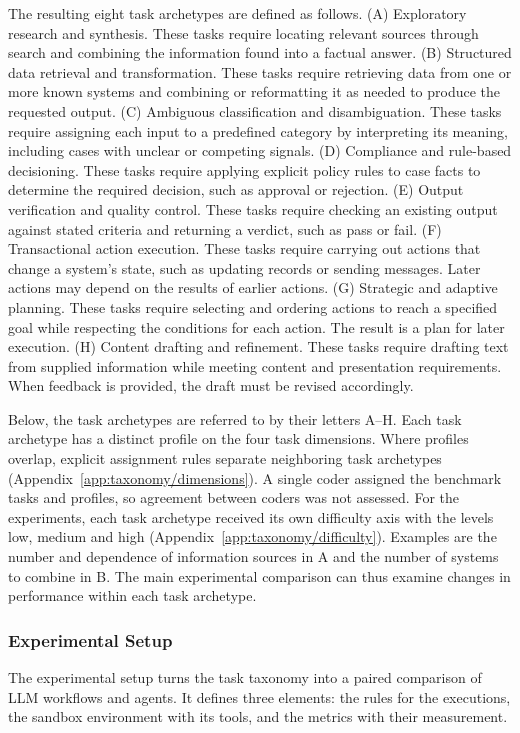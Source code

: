 The resulting eight task archetypes are defined as follows. (A) Exploratory research and synthesis. These tasks require locating relevant sources through search and combining the information found into a factual answer. (B) Structured data retrieval and transformation. These tasks require retrieving data from one or more known systems and combining or reformatting it as needed to produce the requested output. (C) Ambiguous classification and disambiguation. These tasks require assigning each input to a predefined category by interpreting its meaning, including cases with unclear or competing signals. (D) Compliance and rule-based decisioning. These tasks require applying explicit policy rules to case facts to determine the required decision, such as approval or rejection. (E) Output verification and quality control. These tasks require checking an existing output against stated criteria and returning a verdict, such as pass or fail. (F) Transactional action execution. These tasks require carrying out actions that change a system's state, such as updating records or sending messages. Later actions may depend on the results of earlier actions. (G) Strategic and adaptive planning. These tasks require selecting and ordering actions to reach a specified goal while respecting the conditions for each action. The result is a plan for later execution. (H) Content drafting and refinement. These tasks require drafting text from supplied information while meeting content and presentation requirements. When feedback is provided, the draft must be revised accordingly.

Below, the task archetypes are referred to by their letters A--H. Each task archetype has a distinct profile on the four task dimensions. Where profiles overlap, explicit assignment rules separate neighboring task archetypes (Appendix~\ref{app:taxonomy/dimensions}). A single coder assigned the benchmark tasks and profiles, so agreement between coders was not assessed. For the experiments, each task archetype received its own difficulty axis with the levels low, medium and high (Appendix~\ref{app:taxonomy/difficulty}). Examples are the number and dependence of information sources in A and the number of systems to combine in B. The main experimental comparison can thus examine changes in performance within each task archetype.

\subsubsection{Experimental Setup}
\label{subsubsec:TADF/setup}
The experimental setup turns the task taxonomy into a paired comparison of LLM workflows and agents. It defines three elements: the rules for the executions, the sandbox environment with its tools, and the metrics with their measurement.

